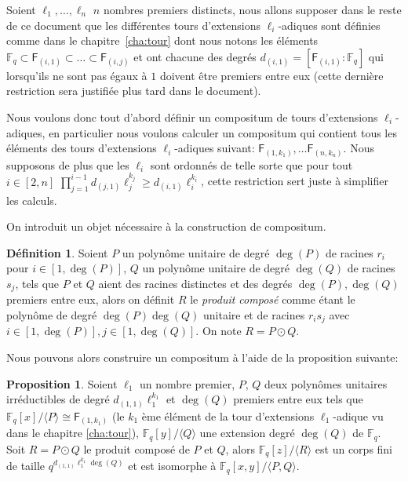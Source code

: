 \documentclass[10pt,a4paper]{book}
\theoremstyle{plain}
\theoremstyle{definition}
\theoremstyle{definition}
\theoremstyle{definition}
\theoremstyle{definition}
\newtheorem{prop}[thm]{Proposition}
\theoremstyle{definition}
\newtheorem{defi}[thm]{Définition}
\theoremstyle{remark}
\theoremstyle{remark}
\theoremstyle{definition}
\begin{document}
Soient $\ell_1, \dots, \ell_n$ $n$ nombres premiers distincts, 
nous allons supposer dans le reste de ce document que les différentes tours 
d'extensions $\ell_i$-adiques sont définies comme dans le 
chapitre~\ref{cha:tour} dont nous notons les éléments 
$\mathbb{F}_q \subset \mathsf{F}_{(i,1)} \subset \dots \subset  \mathsf{F}_{(i,j)}$ 
et ont chacune des degrés $d_{(i,1)}=[\mathsf{F}_{(i,1)}:\mathbb{F}_q]$ qui lorsqu'ils 
ne sont pas égaux à $1$ doivent être premiers entre eux (cette dernière 
restriction sera justifiée plus tard dans le document).

Nous voulons donc tout d'abord définir un compositum de tours d'extensions 
$\ell_i$-adiques, en particulier nous voulons calculer un compositum qui 
contient tous les éléments des tours d'extensions $\ell_i$-adiques suivant:
$\mathsf{F}_{(1,k_1)}, \dots \mathsf{F}_{(n,k_n)}$. Nous supposons de plus que 
les $\ell_i$ sont ordonnés de telle sorte que pour tout $i \in [2,n]$ 
$\prod_{j=1}^{i-1}d_{(j,1)}\ell_j^{k_j} \geqslant d_{(i,1)}\ell_i^{k_i}$, cette restriction
sert juste à simplifier les calculs.

On introduit un objet nécessaire à la construction de compositum.
\begin{defi}
Soient $P$ un polynôme unitaire de degré $\deg(P)$ de racines $r_i$ pour 
$i \in [1,\deg(P)]$, $Q$ un polynôme unitaire de degré $\deg(Q)$ de racines 
$s_j$, tels que $P$ et $Q$ aient des racines distinctes et des degrés $\deg(P),
\deg(Q)$ premiers entre eux, alors on définit $R$ le \emph{produit composé} 
comme étant le polynôme de degré $\deg(P)\deg(Q)$ unitaire et de racines 
$r_is_j$ avec $i \in [1,\deg(P)], j \in [1,\deg(Q)]$. On note $R= P\odot Q$.  
\end{defi}
Nous pouvons alors construire un compositum à l'aide de la proposition 
suivante: 
\begin{prop}
\label{pro:init:com}
Soient $\ell_1$ un nombre premier, $P$, $Q$ deux 
polynômes unitaires irréductibles de degré $d_{(1,1)}\ell_1^{k_1}$ et $\deg(Q)$ 
premiers entre eux tels que $\mathbb{F}_q[x]/\langle P \rangle \cong 
\mathsf{F}_{(1,k_1)}$ (le $k_1$ ème élément de la tour d'extensions 
$\ell_1$-adique vu dans le chapitre \ref{cha:tour}), $\mathbb{F}_q[y]/\langle Q 
\rangle$ une extension degré $\deg(Q)$ de $\mathbb{F}_q$.
 Soit $R=P\odot Q$  le produit composé de $P$ et $Q$, alors 
 $\mathbb{F}_q[z]/\langle R \rangle$ est un corps fini de taille 
 $q^{d_{(1,1)}\ell_1^{k_1}\deg(Q)}$ et est isomorphe à $\mathbb{F}_q[x,y]/
 \langle P,Q \rangle$.
\end{prop}
\end{document}
